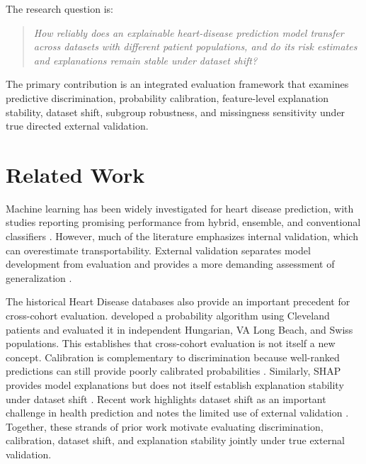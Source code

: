 \documentclass[10pt,journal,twocolumn]{IEEEtran}
\begin{document}
The research question is:

\begin{quote}
\emph{How reliably does an explainable heart-disease prediction model transfer across datasets with different patient populations, and do its risk estimates and explanations remain stable under dataset shift?}
\end{quote}

The primary contribution is an integrated evaluation framework that examines predictive discrimination, probability calibration, feature-level explanation stability, dataset shift, subgroup robustness, and missingness sensitivity under true directed external validation.


\section{Related Work}

Machine learning has been widely investigated for heart disease prediction, with studies reporting promising performance from hybrid, ensemble, and conventional classifiers \parencite{mohan2019,jindal2021,bhatt2023}. However, much of the literature emphasizes internal validation, which can overestimate transportability. External validation separates model development from evaluation and provides a more demanding assessment of generalization \parencite{wessler2021,collins2014,snell2021}.

The historical Heart Disease databases also provide an important precedent for cross-cohort evaluation. \textcite{detrano1989} developed a probability algorithm using Cleveland patients and evaluated it in independent Hungarian, VA Long Beach, and Swiss populations. This establishes that cross-cohort evaluation is not itself a new concept. Calibration is complementary to discrimination because well-ranked predictions can still provide poorly calibrated probabilities \parencite{vancalster2019}. Similarly, SHAP provides model explanations but does not itself establish explanation stability under dataset shift \parencite{lundberg2017}. Recent work highlights dataset shift as an important challenge in health prediction and notes the limited use of external validation \parencite{silva2025}. Together, these strands of prior work motivate evaluating discrimination, calibration, dataset shift, and explanation stability jointly under true external validation.
\end{document}
